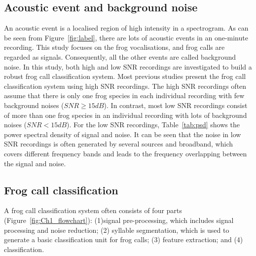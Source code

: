 \subsection{Acoustic event and background noise}
An acoustic event is a localised region of high intensity in a spectrogram. As can be seen from Figure~\ref{fig:label}, there are lots of acoustic events in an one-minute recording. This study focuses on the frog vocalisations, and frog calls are regarded as signals. Consequently, all the other events are called background noise. 
In this study, both high and low SNR recordings are investigated to build a robust frog call classification system. Most previous studies present the frog call classification system using high SNR recordings. The high SNR recordings often assume that there is only one frog species in each individual recording with few background noises ($SNR \geq 15 dB$). In contrast, most low SNR recordings consist of more than one frog species in an individual recording with lots of background noises ($SNR < 15 dB$). 
For the low SNR recordings, Table~\ref{tab:psd} shows the power spectral density of signal and noise. It can be seen that the noise in low SNR recordings is often generated by several sources and broadband, which covers different frequency bands and leads to the frequency overlapping between the signal and noise. 







\subsection{Frog call classification}

A frog call classification system often consists of four parts (Figure~\ref{fig:Ch1_flowchart}): (1)signal pre-processing, which includes signal processing and noise reduction; (2) syllable segmentation, which is used to generate a basic classification unit for frog calls; (3) feature extraction; and (4) classification.  




